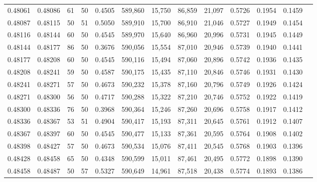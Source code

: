 \begin{tabular}{rrrrrrrrrrrrr}
0.48061 & 0.48086 &    61 &  50 &                                     0.4505 & 589,860 &  15,750 &  86,859 &  21,097 & 0.5726 & 0.1954 & 0.1459 \\
0.48087 & 0.48115 &    50 &  51 &                                     0.5050 & 589,910 &  15,700 &  86,910 &  21,046 & 0.5727 & 0.1949 & 0.1454 \\
0.48116 & 0.48144 &    60 &  50 &                                     0.4545 & 589,970 &  15,640 &  86,960 &  20,996 & 0.5731 & 0.1945 & 0.1449 \\
0.48144 & 0.48177 &    86 &  50 &                                     0.3676 & 590,056 &  15,554 &  87,010 &  20,946 & 0.5739 & 0.1940 & 0.1441 \\
0.48177 & 0.48208 &    60 &  50 &                                     0.4545 & 590,116 &  15,494 &  87,060 &  20,896 & 0.5742 & 0.1936 & 0.1435 \\
0.48208 & 0.48241 &    59 &  50 &                                     0.4587 & 590,175 &  15,435 &  87,110 &  20,846 & 0.5746 & 0.1931 & 0.1430 \\
0.48241 & 0.48271 &    57 &  50 &                                     0.4673 & 590,232 &  15,378 &  87,160 &  20,796 & 0.5749 & 0.1926 & 0.1424 \\
0.48271 & 0.48300 &    56 &  50 &                                     0.4717 & 590,288 &  15,322 &  87,210 &  20,746 & 0.5752 & 0.1922 & 0.1419 \\
0.48300 & 0.48336 &    76 &  50 &                                     0.3968 & 590,364 &  15,246 &  87,260 &  20,696 & 0.5758 & 0.1917 & 0.1412 \\
0.48336 & 0.48367 &    53 &  51 &                                     0.4904 & 590,417 &  15,193 &  87,311 &  20,645 & 0.5761 & 0.1912 & 0.1407 \\
0.48367 & 0.48397 &    60 &  50 &                                     0.4545 & 590,477 &  15,133 &  87,361 &  20,595 & 0.5764 & 0.1908 & 0.1402 \\
0.48398 & 0.48427 &    57 &  50 &                                     0.4673 & 590,534 &  15,076 &  87,411 &  20,545 & 0.5768 & 0.1903 & 0.1396 \\
0.48428 & 0.48458 &    65 &  50 &                                     0.4348 & 590,599 &  15,011 &  87,461 &  20,495 & 0.5772 & 0.1898 & 0.1390 \\
0.48458 & 0.48487 &    50 &  57 &                                     0.5327 & 590,649 &  14,961 &  87,518 &  20,438 & 0.5774 & 0.1893 & 0.1386 \\

\end{tabular}
